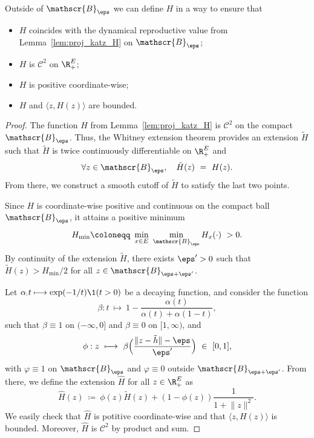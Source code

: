 \begin{refsegment}
\begin{lem}[Extension of $H$ on $\R_+^E$]\label{lem:H_outside_domain_attraction}
Outside of $\mathscr{B}_{\eps}$ we can define $H$ in a way to ensure that 
\begin{itemize}
\item $H$ coincides with the dynamical reproductive value from Lemma~\ref{lem:proj_katz_H} on $\mathscr{B}_{\eps}$;
\item $H$ is $\mathcal{C}^2$ on $\R_+^E$;
\item $H$ is positive coordinate-wise;
\item $H$ and $\langle z, H(z)\rangle$ are bounded.
\end{itemize}
\end{lem}
\begin{proof}
  The function $H$ from Lemma~\ref{lem:proj_katz_H} is $\mathcal{C}^2$ on the compact $\mathscr{B}_{\eps}$. Thus, the  Whitney extension theorem provides an extension $\tilde H$ such that  $\tilde H$  is twice continuously differentiable on $\R_+^E$ and 
  \[
 \forall z\in\mathscr{B}_{\eps},\quad \tilde H(z)\ =\ H(z).
  \]
  From there, we construct a smooth cutoff of $\tilde H$ to satisfy the last two points.
  
  Since $H$ is coordinate-wise positive and continuous on the compact ball $\mathscr{B}_{\eps}$, it attains a positive minimum
\[ H_{\min} \coloneqq\ \min_{x\in E}\ \min_{ \mathscr{B}_{\eps}} H_x(\cdot )\ >0 .
\]
By continuity of the extension $\tilde H$, there exists $\eps'>0$ such that $\tilde H(z)> H_{\min}/2$ for all $z\in\mathscr{B}_{\eps +\eps'}$.



  Let $\alpha_: t\longmapsto \exp(-1/t)\1(t>0)$ be a decaying function, and consider the function
  \[
\beta: t\ \longmapsto\ 1- \frac{\alpha(t)}{\alpha(t)+\alpha(1-t)},
  \]
  such that $\beta \equiv 1$ on $(-\infty, 0]$ and $\beta \equiv 0$ on $[1,\infty)$,
and
\[
\phi: z\ \longmapsto\ \beta\Big(\frac{\lVert z- \tilde h\rVert - \eps}{\eps'}\Big)\ \in\ [0,1],
\]
  with $\varphi\equiv1$ on $\mathscr{B}_\eps$ and $\varphi\equiv0$ outside $\mathscr{B}_{\eps+\eps'}$.
  From there, we define the extension $\hat H$ for all $z\in\R_+^E$ as
  \[
  \hat H(z)\ \coloneqq\ \phi(z)\tilde H(z) + (1-\phi(z))\frac{1}{1+\lVert z\rVert^2}.
  \]
  We easily check that $\hat H$ is potitive coordinate-wise and that $\langle z, H(z)\rangle$ is bounded. Moreover, $\hat H$ is $\mathcal{C}^2$ by product and sum.
\end{proof}



\end{refsegment}
